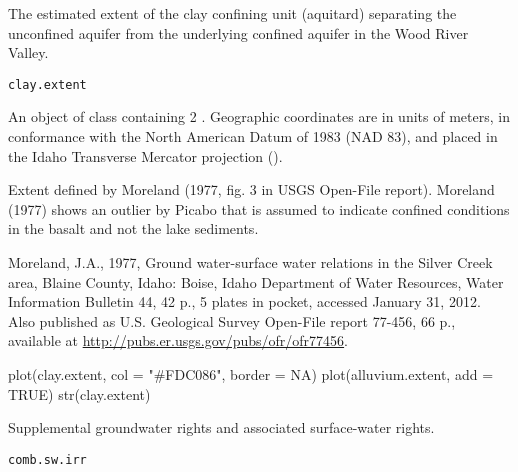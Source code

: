 \documentclass[letterpaper]{book}
\begin{document}
%
\begin{Description}\relax
The estimated extent of the clay confining unit (aquitard) separating the unconfined aquifer from the underlying confined aquifer in the Wood River Valley.
\end{Description}
%
\begin{Usage}
\begin{verbatim}
clay.extent
\end{verbatim}
\end{Usage}
%
\begin{Format}
An object of  class containing 2 .
Geographic coordinates are in units of meters, in conformance with the North American Datum of 1983 (NAD 83), and placed in the
Idaho Transverse Mercator projection ().
\end{Format}
%
\begin{Source}\relax
Extent defined by Moreland (1977, fig. 3 in USGS Open-File report).
Moreland (1977) shows an outlier by Picabo that is assumed to indicate confined conditions in the basalt and not the lake sediments.
\end{Source}
%
\begin{References}\relax
Moreland, J.A., 1977, Ground water-surface water relations in the Silver Creek area, Blaine County, Idaho: Boise, Idaho Department of Water Resources, Water Information Bulletin 44, 42 p., 5 plates in pocket, accessed January 31, 2012.
Also published as U.S. Geological Survey Open-File report 77-456, 66 p., available at \url{http://pubs.er.usgs.gov/pubs/ofr/ofr77456}.
\end{References}
%
\begin{Examples}
\begin{ExampleCode}
plot(clay.extent, col = "#FDC086", border = NA)
plot(alluvium.extent, add = TRUE)
str(clay.extent)
\end{ExampleCode}
\end{Examples}
%
\begin{Description}\relax
Supplemental groundwater rights and associated surface-water rights.
\end{Description}
%
\begin{Usage}
\begin{verbatim}
comb.sw.irr
\end{verbatim}
\end{Usage}
\end{document}
